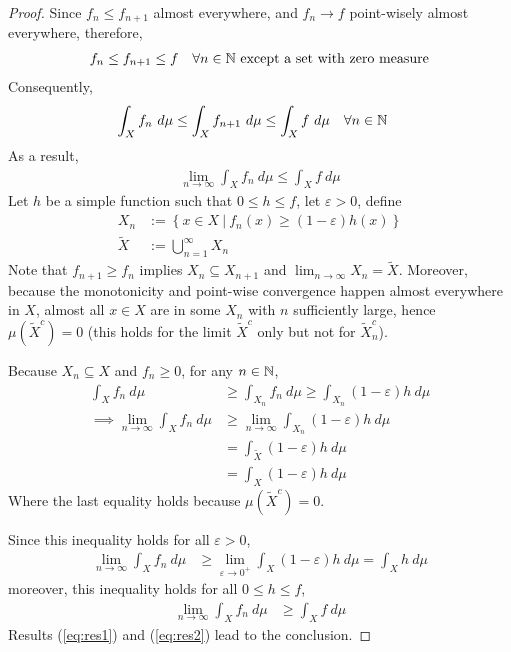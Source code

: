\documentclass[11pt]{article}
\begin{document}
	\begin{proof}
		Since $f_{n} \leq f_{n+1}$ almost everywhere, and $f_n \to f$ point-wisely almost everywhere, therefore,
		\begin{align}
			f_n \leq f_{n+1} \leq f\quad \forall n \in \mathbb{N} \text{{ except a set with zero measure}}
		\end{align}
		Consequently,
		\begin{align}
			\int_X f_n\ d\mu &\leq \int_X f_{n+1}\ d\mu\leq \int_X f\ d\mu\quad \forall n \in \mathbb{N}
		\end{align}
		As a result,
		\begin{align}
			\lim_{n \to \infty} \int_X f_n\ d\mu \leq \int_X f\ d\mu \label{eq:res1}
		\end{align}
		Let $h$ be a simple function such that $0 \leq h \leq f$, let $\varepsilon > 0$, define
		\begin{align}
			X_n &:= \left\{x \in X\ |\ f_n(x) \geq (1 - \varepsilon) h(x) \right\} \\
			\tilde{X} &:= \bigcup_{n=1}^\infty X_n
		\end{align}
		Note that $f_{n+1} \geq f_n$ implies $X_{n} \subseteq X_{n+1}$ and $\lim_{n\to \infty} X_n = \tilde{X}$.
		Moreover, because the monotonicity and point-wise convergence happen almost everywhere in $X$, 
		almost all $x \in X$ are in some $X_n$ with $n$ sufficiently large, hence $\mu(\tilde{X}^c) = 0$ (this holds for the limit $\tilde{X}^c$ only but not for $\tilde{X}_n^c$).
		
		Because $X_n \subseteq X$ and $f_n \geq 0$, for any $n \in \mathbb{N}$,
		\begin{align}
			\int_X f_n\ d\mu &\geq \int_{X_n}f_n\ d\mu \geq \int_{X_n} (1 - \varepsilon) h\ d\mu \\
			\implies \lim_{n \to \infty} \int_X f_n\ d\mu &\geq \lim_{n \to \infty} \int_{X_n} (1 - \varepsilon) h\ d\mu \\
			&= \int_{\tilde{X}} (1 - \varepsilon) h\ d\mu \\
			&= \int_{X} (1 - \varepsilon) h\ d\mu
		\end{align}
		Where the last equality holds because $\mu(\tilde{X}^c) = 0$.
		
		Since this inequality holds for all $\varepsilon > 0$,
		\begin{align}
			\lim_{n \to \infty} \int_X f_n\ d\mu &\geq \lim_{\varepsilon \to 0^+} \int_{X} (1 - \varepsilon) h\ d\mu = \int_X h\ d\mu
		\end{align}
		moreover, this inequality holds for all $0 \leq h \leq f$,
		\begin{align}
			\lim_{n \to \infty} \int_X f_n\ d\mu &\geq \int_{X} f\ d\mu \label{eq:res2}
		\end{align}
		Results (\ref{eq:res1}) and (\ref{eq:res2}) lead to the conclusion.
	\end{proof}
	
\end{document}
